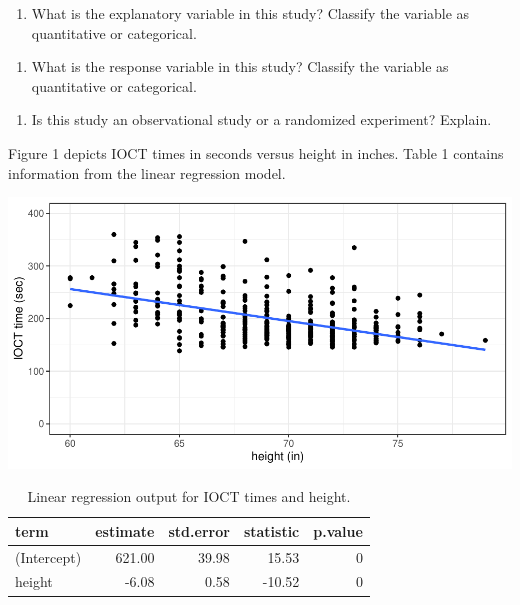 \documentclass[]{book}
\providecommand{\tightlist}{%
  \setlength{\itemsep}{0pt}\setlength{\parskip}{0pt}}
\begin{document}
\begin{enumerate}
\def\labelenumi{\arabic{enumi}.}
\setcounter{enumi}{1}
\tightlist
\item
  What is the explanatory variable in this study? Classify the variable as quantitative or categorical.
\end{enumerate}

\vspace{0.25in}

\begin{enumerate}
\def\labelenumi{\arabic{enumi}.}
\setcounter{enumi}{2}
\tightlist
\item
  What is the response variable in this study? Classify the variable as quantitative or categorical.
\end{enumerate}

\vspace{0.25in}

\begin{enumerate}
\def\labelenumi{\arabic{enumi}.}
\setcounter{enumi}{3}
\tightlist
\item
  Is this study an observational study or a randomized experiment? Explain.
\end{enumerate}

\vspace{1in}

\newpage

Figure 1 depicts IOCT times in seconds versus height in inches. Table 1 contains information from the linear regression model.

\includegraphics{MA206supplement_files/figure-latex/unnamed-chunk-16-1.pdf}

\begin{table}

\caption{\label{tab:unnamed-chunk-16}Linear regression output for IOCT times and height.}
\centering
\begin{tabular}[t]{l|r|r|r|r}
\hline
term & estimate & std.error & statistic & p.value\\
\hline
(Intercept) & 621.00 & 39.98 & 15.53 & 0\\
\hline
height & -6.08 & 0.58 & -10.52 & 0\\
\hline
\end{tabular}
\end{table}
\end{document}
